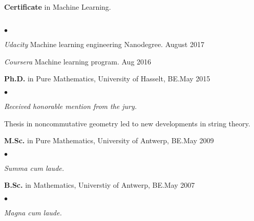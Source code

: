 \documentclass[margin,line,pifont,palatino,courierm]{res}
\newenvironment{list2}{
  \begin{list}{$\bullet$}{%
      \setlength{\itemsep}{0in}
      \setlength{\parsep}{0in} \setlength{\parskip}{0in}
      \setlength{\topsep}{0in} \setlength{\partopsep}{0in}
      \setlength{\leftmargin}{0.2in}}}{\end{list}}
\begin{document}
\begin{resume}
{\bf Certificate} in Machine Learning.\\\
\begin{list2}
\vspace*{-.1in}
\item \emph{Udacity} Machine learning engineering Nanodegree.\hfill{ August 2017}
\vspace{0.05in}
\item \emph{Coursera} Machine learning program. \hfill{Aug 2016}
\end{list2}


{\bf Ph.D.} in Pure Mathematics, University of Hasselt, BE.\hfill May 2015\\
\begin{list2}
\vspace*{-.1in}
\item \emph{Received honorable mention from the jury.}
\vspace{0.05in}
\item{Thesis in noncommutative geometry led to new developments in string theory.}
\end{list2}


{\bf M.Sc.} in Pure Mathematics, University of Antwerp, BE.\hfill May 2009\\
\begin{list2}
\vspace*{-.1in}
\item \emph{Summa cum laude.}
\end{list2}


{\bf B.Sc.} in Mathematics, Universtiy of Antwerp, BE.\hfill May 2007\\
\begin{list2}
\vspace*{-.1in}
\item \emph{Magna cum laude.}
\end{list2}
\newpage





\end{resume}
\end{document}
